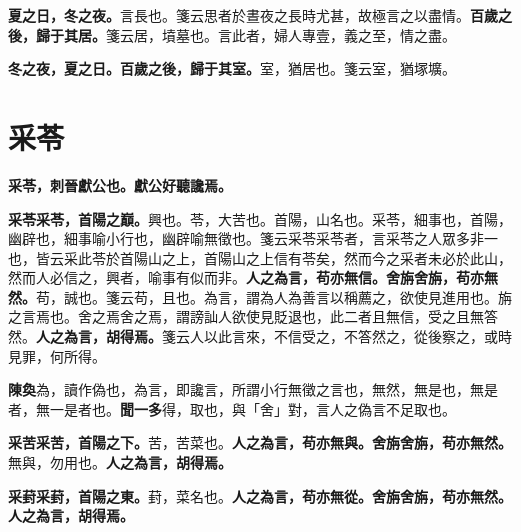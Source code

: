 \textbf{夏之日，冬之夜。}{\footnotesize 言長也。箋云思者於晝夜之長時尤甚，故極言之以盡情。}\textbf{百歲之後，歸于其居。}{\footnotesize 箋云居，墳墓也。言此者，婦人專壹，義之至，情之盡。}

\textbf{冬之夜，夏之日。百歲之後，歸于其室。}{\footnotesize 室，猶居也。箋云室，猶塚壙。}

\section{采苓}


\textbf{采苓，刺晉獻公也。獻公好聽讒焉。}

\textbf{采苓采苓，首陽之巔。}{\footnotesize 興也。苓，大苦也。首陽，山名也。采苓，細事也，首陽，幽辟也，細事喻小行也，幽辟喻無徵也。箋云采苓采苓者，言采苓之人眾多非一也，皆云采此苓於首陽山之上，首陽山之上信有苓矣，然而今之采者未必於此山，然而人必信之，興者，喻事有似而非。}\textbf{人之為言，苟亦無信。舍旃舍旃，苟亦無然。}{\footnotesize 苟，誠也。箋云苟，且也。為言，謂為人為善言以稱薦之，欲使見進用也。旃之言焉也。舍之焉舍之焉，謂謗訕人欲使見貶退也，此二者且無信，受之且無答然。}\textbf{人之為言，胡得焉。}{\footnotesize 箋云人以此言來，不信受之，不答然之，從後察之，或時見罪，何所得。}

\begin{quoting}\textbf{陳奐}為，讀作偽也，為言，即讒言，所謂小行無徵之言也，無然，無是也，無是者，無一是者也。\textbf{聞一多}得，取也，與「舍」對，言人之偽言不足取也。\end{quoting}

\textbf{采苦采苦，首陽之下。}{\footnotesize 苦，苦菜也。}\textbf{人之為言，苟亦無與。舍旃舍旃，苟亦無然。}{\footnotesize 無與，勿用也。}\textbf{人之為言，胡得焉。}

\textbf{采葑采葑，首陽之東。}{\footnotesize 葑，菜名也。}\textbf{人之為言，苟亦無從。舍旃舍旃，苟亦無然。人之為言，胡得焉。}

